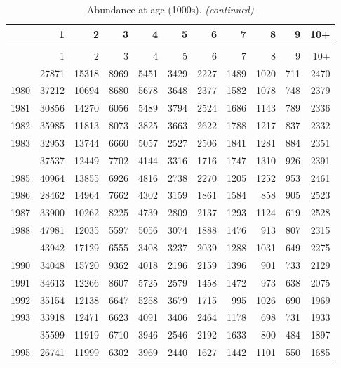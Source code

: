 \documentclass[
]{article}
\begin{document}
\begin{longtable}[t]{lrrrrrrrrrr}
\caption{\label{tab:NAA-table}Abundance at age (1000s).}\\
\toprule
  & 1 & 2 & 3 & 4 & 5 & 6 & 7 & 8 & 9 & 10+\\
\midrule
\endfirsthead
\caption[]{Abundance at age (1000s). \textit{(continued)}}\\
\toprule
  & 1 & 2 & 3 & 4 & 5 & 6 & 7 & 8 & 9 & 10+\\
\midrule
\endhead

\endfoot
\bottomrule
\endlastfoot
1979 & 27871 & 15318 & 8969 & 5451 & 3429 & 2227 & 1489 & 1020 & 711 & 2470\\
1980 & 37212 & 10694 & 8680 & 5678 & 3648 & 2377 & 1582 & 1078 & 748 & 2379\\
1981 & 30856 & 14270 & 6056 & 5489 & 3794 & 2524 & 1686 & 1143 & 789 & 2336\\
1982 & 35985 & 11813 & 8073 & 3825 & 3663 & 2622 & 1788 & 1217 & 837 & 2332\\
1983 & 32953 & 13744 & 6660 & 5057 & 2527 & 2506 & 1841 & 1281 & 884 & 2351\\
\addlinespace
1984 & 37537 & 12449 & 7702 & 4144 & 3316 & 1716 & 1747 & 1310 & 926 & 2391\\
1985 & 40964 & 13855 & 6926 & 4816 & 2738 & 2270 & 1205 & 1252 & 953 & 2461\\
1986 & 28462 & 14964 & 7662 & 4302 & 3159 & 1861 & 1584 & 858 & 905 & 2523\\
1987 & 33900 & 10262 & 8225 & 4739 & 2809 & 2137 & 1293 & 1124 & 619 & 2528\\
1988 & 47981 & 12035 & 5597 & 5056 & 3074 & 1888 & 1476 & 913 & 807 & 2315\\
\addlinespace
1989 & 43942 & 17129 & 6555 & 3408 & 3237 & 2039 & 1288 & 1031 & 649 & 2275\\
1990 & 34048 & 15720 & 9362 & 4018 & 2196 & 2159 & 1396 & 901 & 733 & 2129\\
1991 & 34613 & 12266 & 8607 & 5725 & 2579 & 1458 & 1472 & 973 & 638 & 2075\\
1992 & 35154 & 12138 & 6647 & 5258 & 3679 & 1715 & 995 & 1026 & 690 & 1969\\
1993 & 33918 & 12471 & 6623 & 4091 & 3406 & 2464 & 1178 & 698 & 731 & 1933\\
\addlinespace
1994 & 35599 & 11919 & 6710 & 3946 & 2546 & 2192 & 1633 & 800 & 484 & 1897\\
1995 & 26741 & 11999 & 6302 & 3969 & 2440 & 1627 & 1442 & 1101 & 550 & 1685\\

\end{longtable}
\end{document}

